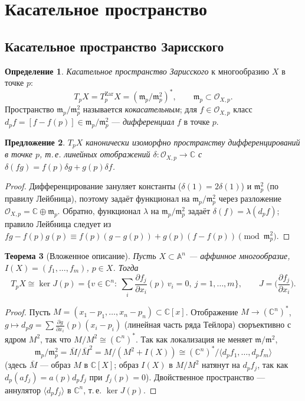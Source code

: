 \documentclass[11pt,a4paper]{article}
\theoremstyle{plain}
\newtheorem{theorem}{Теорема}[section]
\newtheorem{proposition}[theorem]{Предложение}
\theoremstyle{definition}
\newtheorem{definition}[theorem]{Определение}
\theoremstyle{remark}
\renewcommand{\C}{\mathbb{C}}
\newcommand{\A}{\mathbb{A}}
\newcommand{\cO}{\mathcal{O}}
\newcommand{\mm}{\mathfrak{m}}
\newcommand{\Zar}{\mathrm{Zar}}
\begin{document}
\section{Касательное пространство}\label{sec:tangent}

\subsection{Касательное пространство Зарисского}

\begin{definition}
\emph{Касательное пространство Зарисского} к многообразию $X$ в точке $p$:
\[
T_pX=T^{\Zar}_pX=(\mm_p/\mm_p^2)^*,\qquad \mm_p\subset\cO_{X,p}.
\]
Пространство $\mm_p/\mm_p^2$ называется \emph{кокасательным}; для $f\in\cO_{X,p}$ класс
$d_pf=[f-f(p)]\in\mm_p/\mm_p^2$ --- \emph{дифференциал} $f$ в точке $p$.
\end{definition}

\begin{proposition}\label{prop:derivations}
$T_pX$ канонически изоморфно пространству \emph{дифференцирований в точке $p$}, т.\,е.
линейных отображений $\delta\colon\cO_{X,p}\to\C$ с $\delta(fg)=f(p)\delta g+g(p)\delta f$.
\end{proposition}
\begin{proof}
Дифференцирование зануляет константы ($\delta(1)=2\delta(1)$) и $\mm_p^2$ (по правилу Лейбница),
поэтому задаёт функционал на $\mm_p/\mm_p^2$ через разложение $\cO_{X,p}=\C\oplus\mm_p$.
Обратно, функционал $\lambda$ на $\mm_p/\mm_p^2$ задаёт $\delta(f)=\lambda(d_pf)$; правило
Лейбница следует из $fg-f(p)g(p)\equiv f(p)(g-g(p))+g(p)(f-f(p))\pmod{\mm_p^2}$.
\end{proof}

\begin{theorem}[Вложенное описание]\label{thm:jacobian}
Пусть $X\subset\A^n$ --- аффинное многообразие, $I(X)=(f_1,\dots,f_m)$, $p\in X$. Тогда
\[
T_pX\cong\ker J(p)=\Big\{v\in\C^n:\ \sum_{i}\frac{\partial f_j}{\partial x_i}(p)\,v_i=0,\
j=1,\dots,m\Big\},\qquad J=\Big(\frac{\partial f_j}{\partial x_i}\Big).
\]
\end{theorem}
\begin{proof}
Пусть $M=(x_1-p_1,\dots,x_n-p_n)\subset\C[x]$. Отображение $M\to(\C^n)^*$,
$g\mapsto d_pg=\sum\frac{\partial g}{\partial x_i}(p)(x_i-p_i)$ (линейная часть ряда Тейлора)
сюръективно с ядром $M^2$, так что $M/M^2\cong(\C^n)^*$. Так как локализация не меняет $\mm/\mm^2$,
\[
\mm_p/\mm_p^2=\bar M/\bar M^2=M/(M^2+I(X))\cong(\C^n)^*/\langle d_pf_1,\dots,d_pf_m\rangle
\]
(здесь $\bar M$ --- образ $M$ в $\C[X]$; образ $I(X)$ в $M/M^2$ натянут на $d_pf_j$, так как
$d_p(af_j)=a(p)d_pf_j$ при $f_j(p)=0$). Двойственное пространство --- аннулятор
$\langle d_pf_j\rangle$ в $\C^n$, т.\,е. $\ker J(p)$.
\end{proof}
\end{document}
